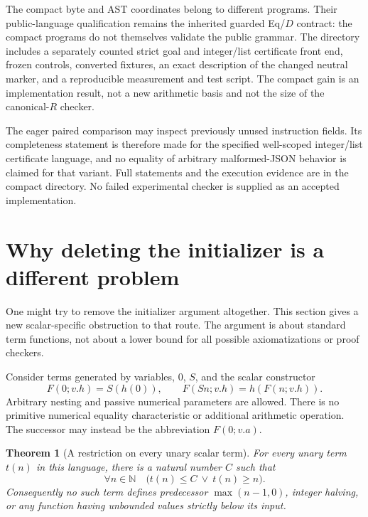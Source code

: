\documentclass[11pt]{article}
\newtheorem{theorem}{Theorem}[section]
\theoremstyle{definition}
\begin{document}
The compact byte and AST coordinates belong to different programs. Their
public-language qualification remains the inherited guarded Eq/$D$ contract:
the compact programs do not themselves validate the public grammar. The
directory includes a separately counted strict goal and integer/list
certificate front end, frozen controls, converted fixtures, an exact
description of the changed neutral marker, and a reproducible measurement
and test script. The compact gain is an implementation result, not a new
arithmetic basis and not the size of the canonical-$R$ checker.

The eager paired comparison may inspect previously unused instruction
fields. Its completeness statement is therefore made for the specified
well-scoped integer/list certificate language, and no equality of arbitrary
malformed-JSON behavior is claimed for that variant. Full statements and
the execution evidence are in the compact directory. No failed experimental
checker is supplied as an accepted implementation.



\section{Why deleting the initializer is a different problem}
\label{sec:scalar-obstruction}

One might try to remove the initializer argument altogether. This section
gives a new scalar-specific obstruction to that route. The argument is about
standard term functions, not about a lower bound for all possible
axiomatizations or proof checkers.

Consider terms generated by variables, $0$, $S$, and the scalar constructor
\[
 F(0;v.h)=S(h(0)),\qquad
 F(Sn;v.h)=h(F(n;v.h)).
\]
Arbitrary nesting and passive numerical parameters are allowed. There is no
primitive numerical equality characteristic or additional arithmetic
operation. The successor may instead be the abbreviation $F(0;v.a)$.

\begin{theorem}[A restriction on every unary scalar term]
\label{thm:unary-bound}
For every unary term $t(n)$ in this language, there is a natural number $C$
such that
\[
 \forall n\in\mathbb N\quad
       \bigl(t(n)\leq C\ \lor\ t(n)\geq n\bigr).
\]
Consequently no such term defines predecessor $\max(n-1,0)$, integer
halving, or any function having unbounded values strictly below its input.
\end{theorem}
\end{document}
